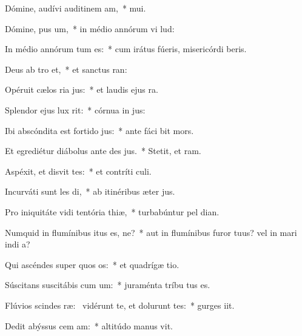 \item Dómine, audívi auditinem am,~*  mui.
\item Dómine, pus um,~* in médio annórum vi lud:
\item In médio annórum tum es:~* cum irátus fúeris, misericórdi beris.
\item Deus ab tro et,~* et sanctus   ran:
\item Opéruit cælos ria jus:~* et laudis ejus   ra.
\item Splendor ejus  lux rit:~* córnua in  jus:
\item Ibi abscóndita est fortido jus:~* ante fáci  bit mors.
\item Et egrediétur diábolus ante des jus.~* Stetit, et   ram.
\item Aspéxit, et disvit tes:~* et contríti   culi.
\item Incurváti sunt les di,~* ab itinéribus æter jus.
\item Pro iniquitáte vidi tentória thiæ,~* turbabúntur pel  dian.
\item Numquid in flumínibus itus es, ne?~* aut in flumínibus furor tuus? vel in mari indi a?
\item Qui ascéndes super quos os:~* et quadrígæ  tio.
\item Súscitans suscitábis cum um:~* juraménta tríbu  tus es.
\item Flúvios scindes ræ:~\pscross{} vidérunt te, et dolurunt tes:~* gurges  iit.
\item Dedit abýssus cem am:~* altitúdo manus  vit.
